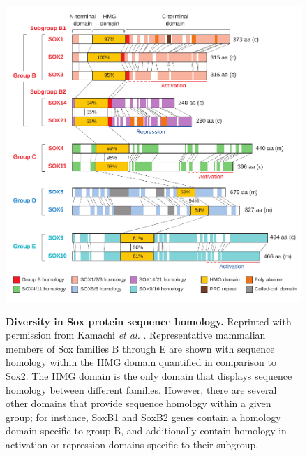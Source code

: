 \documentclass[withindex,glossary]{cam-thesis}
\begin{document}
\setcounter{figure}{1-1}
\begin{figure}[htbp]
\centering
\includegraphics[width=\textwidth]{figs/Fig1 Kamachi et al.pdf}
\label{fig1}
\caption{\textbf{Diversity in Sox protein sequence homology.} Reprinted with permission from Kamachi \emph{et al.} \protect\citeyear{kamachi_pairing_2000}.  Representative mammalian members of Sox families B through E are shown with sequence homology within the HMG domain quantified in comparison to Sox2. The HMG domain is the only domain that displays sequence homology between different families. However, there are several other domains that provide sequence homology within a given group; for instance, SoxB1 and SoxB2 genes contain a homology domain specific to group B, and additionally contain homology in activation or repression domains specific to their subgroup.}
\end{figure}
\end{document}
